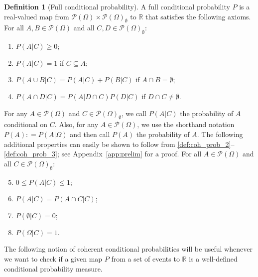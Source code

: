 \documentclass[10pt]{paper}
\theoremstyle{definition}
\newtheorem{definition}{Definition}
\newcommand{\reals}{\mathbb{R}}
\newcommand{\paths}{\Omega}
\newcommand{\power}{\mathcal{P}(\paths)}
\newcommand{\nonemptypower}{\power_{\emptyset}}
\newcommand{\coloneqq}{:\!=}
\begin{document}
\begin{definition}[Full conditional probability]\label{def:cond_prob}
A full conditional probability $P$ is a real-valued map from $\power\times\nonemptypower$ to $\reals$ that satisfies the following axioms. For all $A,B\in\power$ and all \mbox{$C,D\in\nonemptypower$}:
\vspace{5pt}

\begin{enumerate}[label=F\arabic*:,ref=F\arabic*]
\item
$P(A\vert C)\geq 0$;\label{def:coh_prob_2}
\item
$P(A\vert C)=1$ if $C\subseteq A$;\label{def:coh_prob_1}
\item
$P(A\cup B\vert C)=P(A\vert C)+P(B\vert C)$ if $A\cap B=\emptyset$;\label{def:coh_prob_3}
\item
$P(A\cap D\vert C)=P(A\vert D\cap C)P(D\vert C)$ if $D\cap C\neq\emptyset$.\label{def:coh_prob_6}
\end{enumerate}
\vspace{5pt}

\noindent
For any $A\in\power$ and $C\in\nonemptypower$, we call $P(A\vert C)$ the probability of $A$ conditional on $C$. Also, for any $A\in\power$, we use the shorthand notation $P(A)\coloneqq P(A\vert\paths)$ and then call $P(A)$ the probability of $A$.
The following additional properties can easily be shown to follow from \ref{def:coh_prob_2}--\ref{def:coh_prob_3}; see Appendix~\ref{app:prelim} for a proof. For all $A\in\power$ and all $C\in\nonemptypower$:
\vspace{5pt}
\begin{enumerate}[label=F\arabic*:,ref=F\arabic*]
\setcounter{enumi}{4}
\item
$0\leq P(A\vert C)\leq 1$;\label{def:coh_prob_2b}
\item
$P(A\vert C)=P(A\cap C\vert C)$;\label{def:coh_prob_7}
\item
$P(\emptyset\vert C)=0$;\label{def:coh_prob_8}
\item
$P(\Omega\vert C)=1$.\label{def:coh_prob_5}
\end{enumerate}
\vspace{5pt}
\end{definition}


The following notion of coherent conditional probabilities will be useful whenever we want to check if a given map $P$ from a set of events to $\reals$ is a well-defined conditional probability measure.
\end{document}
